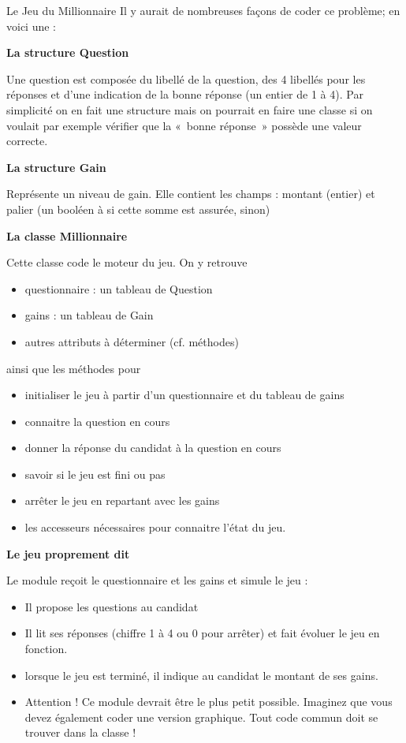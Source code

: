 \begin{Exercice}{Le Jeu du Millionnaire}
	Il y aurait de nombreuses façons de coder ce problème; en voici une :

	{\bfseries
	La structure Question}

	Une question est composée du libellé de la question, des 4 libellés pour
	les réponses et d’une indication de la bonne réponse (un entier de 1 à
	4). Par simplicité on en fait une structure mais on pourrait en faire
	une classe si on voulait par exemple vérifier que la «~bonne réponse~»
	possède une valeur correcte.

	{\bfseries
	La structure Gain}

	Représente un niveau de gain. Elle contient les champs :
	montant (entier) et palier (un booléen à
	 si cette somme est
	assurée,  sinon)

	{\bfseries
	La classe Millionnaire}

	Cette classe code le moteur du jeu. On y retrouve

	\begin{itemize}
		\item 
			questionnaire : un tableau de Question
		\item 
			gains : un tableau de Gain
		\item 
			autres attributs à déterminer (cf. méthodes)
	\end{itemize}
	
	ainsi que les méthodes pour

	\begin{itemize}
		\item 
			initialiser le jeu à partir d’un questionnaire
			et du tableau de gains
		\item 
			connaitre la question en cours
		\item 
			donner la réponse du candidat à la question en
			cours
		\item 
			savoir si le jeu est fini ou pas
		\item 
			arrêter le jeu en repartant avec les gains
		\item 
			les accesseurs nécessaires pour connaitre
			l’état du jeu.
	\end{itemize}
	
	{\bfseries
	Le jeu proprement dit}

	Le module  reçoit le
	questionnaire et les gains et simule le jeu :

	\begin{itemize}
	\item 
		Il propose les questions au candidat
	\item 
		Il lit ses réponses (chiffre 1 à 4 ou 0 pour
		arrêter) et fait évoluer le jeu en fonction.
	\item 
		lorsque le jeu est terminé, il indique au
		candidat le montant de ses gains.
	\item 
		Attention ! Ce module devrait être le plus
		petit possible. Imaginez que vous devez également coder une version
		graphique. Tout code commun doit se trouver dans la classe
	!
	\end{itemize}
\end{Exercice}

